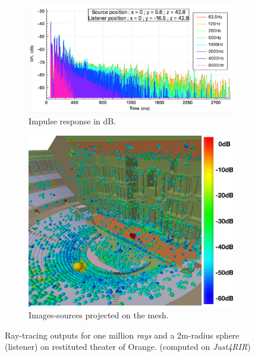 \documentclass[AMA,STIX1COL]{WileyNJD-v2}
\begin{document}
\begin{figure}[t]
\centering
	\begin{subfigure}{0.6\textwidth}
		\includegraphics[width=\linewidth]{rirTheatreAvecDecor}
		\caption{Impulse response in dB.}
		\label{rirTheatre20}
	\end{subfigure}
	\begin{subfigure}{0.37\textwidth}
\includegraphics[width=\linewidth]{SI60dB}
		\caption{Images-sources projected on the mesh.}
		\label{isTheatre20}
	\end{subfigure}
	\caption{Ray-tracing outputs for one million \textit{rays} and a 2m-radius sphere (listener) on restituted theater of Orange.  (computed on \textit{Just4RIR})}
	\label{SI60dB}
\end{figure}
\end{document}
